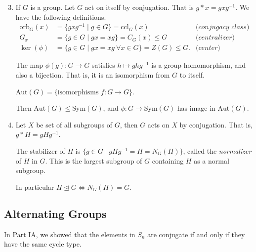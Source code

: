 \begin{enumerate}
    \setcounter{enumi}{2}
    \item If \(G\) is a group. Let \(G\) act on itself by conjugation. That is \(g * x = gxg^{-1}\). We have the following definitions.
    \begin{align*}
        \mathrm{orb}_G(x) &= \{gxg^{-1}\mid g\in G\} = \mathrm{ccl}_G(x) &\textit{(conjugacy class)}\\
        G_x&=\{g\in G\mid gx = xg\} = C_G(x) \leq G &\textit{(centralizer)}\\
        \ker(\phi)&=\{g\in G\mid gx = xg~\forall x\in G\} = Z(G) \leq G. &\textit{(center)}
    \end{align*}
    \begin{note}
        The map \(\phi(g): G\to G\)  satisfies \(h\mapsto ghg^{-1}\) is a group homomorphism, and also a bijection. That is, it is an isomorphism from \(G\) to itself.
    \end{note}
    \begin{definition}
        \(\mathrm{Aut}(G) = \{\text{isomorphisms } f: G\to G\}\).
    \end{definition}
    Then \(\mathrm{Aut}(G) \leq \mathrm{Sym}(G)\), and \(\phi: G \to  \mathrm{Sym}(G)\) has image in \(\mathrm{Aut}(G)\).
    \item Let \(X\) be set of all subgroups of \(G\), then \(G\) acts on \(X\) by conjugation. That is, \(g*H = gHg^{-1}\).
   
    The stabilizer of \(H\) is \(\{g\in G\mid gHg^{-1}=H = N_G(H)\}\), called the \textit{normalizer} of \(H\) in \(G\). This is the largest subgroup of \(G\) containing \(H\) as a normal subgroup.

    In particular \(H \trianglelefteq G \iff N_G(H) = G\).
\end{enumerate}

\subsection{Alternating Groups}
In Part IA, we showed that the elements in \(S_n\) are conjugate if and only if they have the same cycle type.

